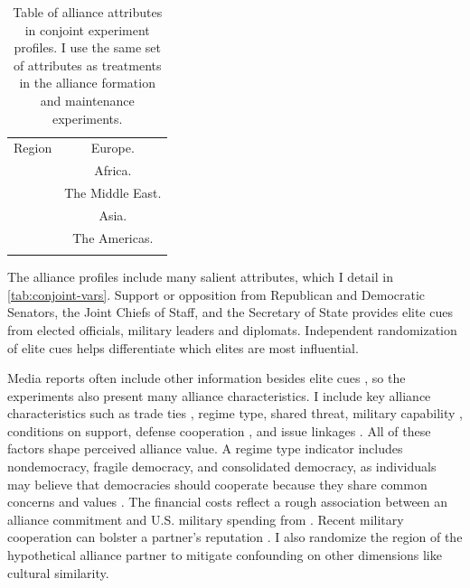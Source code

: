 \documentclass[12pt]{article}
\begin{document}
\begin{table}
\begin{adjustbox}{width = .99\textwidth}
\begin{tabular}{lc}
Region              & Europe. \\ 
                    & Africa. \\
                    & The Middle East. \\ 
                    & Asia. \\   
                    & The Americas. \\ 
                                                                            
\hline \\
\end{tabular}
\end{adjustbox}
\caption{Table of alliance attributes in conjoint experiment profiles. I use the same set of attributes as treatments in the alliance formation and maintenance experiments.} 
\label{tab:conjoint-vars}
\end{table}


The alliance profiles include many salient attributes, which I detail in \autoref{tab:conjoint-vars}. 
Support or opposition from Republican and Democratic Senators, the Joint Chiefs of Staff, and the Secretary of State provides elite cues from elected officials, military leaders and diplomats. 
Independent randomization of elite cues helps differentiate which elites are most influential.


Media reports often include other information besides elite cues \citep{BaumPotter2008}, so the experiments also present many alliance characteristics. 
I include key alliance characteristics such as trade ties \citep{Fordham2010}, regime type, shared threat, military capability \citep{Johnsonetal2015}, conditions on support, defense cooperation \citep{Morrow1994, LeedsAnac2005}, and issue linkages \citep{Poast2012}.
All of these factors shape perceived alliance value. 
A regime type indicator includes nondemocracy, fragile democracy, and consolidated democracy, as individuals may believe that democracies should cooperate because they share common concerns and values \citep{Chuetal2021}. 
The financial costs reflect a rough association between an alliance commitment and U.S. military spending from \citet{AlleyFuhrmann2021}. 
Recent military cooperation can bolster a partner's reputation \citep{Crescenzietal2012, GannonKent2020}.
I also randomize the region of the hypothetical alliance partner to mitigate confounding on other dimensions like cultural similarity.
\end{document}
